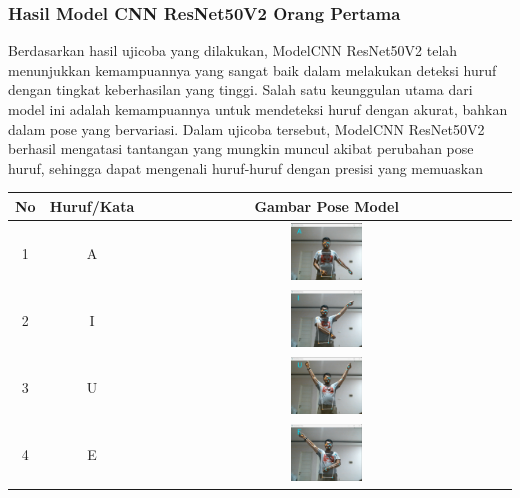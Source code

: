 \subsubsection*{Hasil Model CNN ResNet50V2 Orang Pertama}

Berdasarkan hasil ujicoba yang dilakukan, ModelCNN ResNet50V2 telah menunjukkan kemampuannya yang sangat baik dalam melakukan deteksi huruf dengan tingkat keberhasilan yang tinggi. Salah satu keunggulan utama dari model ini adalah kemampuannya untuk mendeteksi huruf dengan akurat, bahkan dalam pose yang bervariasi. Dalam ujicoba tersebut, ModelCNN ResNet50V2 berhasil mengatasi tantangan yang mungkin muncul akibat perubahan pose huruf, sehingga dapat mengenali huruf-huruf dengan presisi yang memuaskan

	\begin{table}[h]
		\centering
		\label{tbl:Tabel Contoh Huruf/Kata dan Gambar Pose Model CNN ResNet50V2 Orang Pertama}
		\begin{tabular}{|c|c|c|}
		\hline
		No & Huruf/Kata & Gambar Pose Model  \\
		\hline
		1 & A & \includegraphics[width=0.2\textwidth]{gambar/bener/HurufA_ModelCNNResNet50V2_Dawe.png} \\
		\hline
		2 & I & \includegraphics[width=0.2\textwidth]{gambar/bener/HurufI_ModelCNNResNet50V2_Dawe.png} \\
		\hline
		3 & U & \includegraphics[width=0.2\textwidth]{gambar/bener/HurufU_ModelCNNResNet50V2_Dawe.png} \\
		\hline
		4 & E & \includegraphics[width=0.2\textwidth]{gambar/bener/HurufE_ModelCNNResNet50V2_Dawe.png} \\

\end{tabular}
\end{table}
